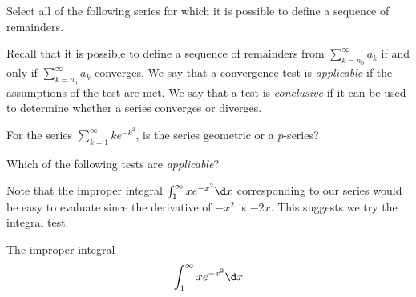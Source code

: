 \documentclass{ximera}
\author{Jim Talamo}
\begin{document}
\begin{exercise}

Select all of the following series for which it is possible to define a sequence of remainders.

\begin{selectAll}
\end{selectAll}

\begin{hint}
Recall that it is possible to define a sequence of remainders from $\sum_{k=n_0}^{\infty} a_k$ if and only if $\sum_{k=n_0}^{\infty} a_k$ converges.  We say that a convergence test is \emph{applicable} if the assumptions of the test are met.  We say that a test is \emph{conclusive} if it can be used to determine whether a series converges or diverges.

\begin{question}
For the series $\sum_{k=1}^{\infty}ke^{-k^2}$, is the series geometric or a $p$-series?

\begin{multipleChoice}
\end{multipleChoice}

 Which of the following tests are \emph{applicable}?

\begin{selectAll}
\end{selectAll}


Note that the improper integral $\int_{1}^{\infty} xe^{-x^2} \d x$ corresponding to our series would be easy to evaluate since the derivative of $-x^2$ is $-2x$. This suggests we try the integral test. 

The improper integral 
\[
\int_{1}^{\infty} xe^{-x^2} \d x
\]

\begin{multipleChoice}
\end{multipleChoice}


\end{question}
\end{hint}
\end{exercise}
\end{document}
